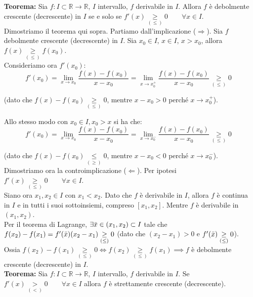 \documentclass{article}
\begin{document}
\noindent\textbf{Teorema:} Sia $f: I \subset \mathbb{R} \xrightarrow{} \mathbb{R}$, $I$ intervallo, $f$ derivabile in $I$. Allora $f$ è debolmente crescente (decrescente) in $I$ se e solo se $f'(x) \underset{(\leq)}{\geq} 0 \qquad \forall x \in I$.\\

\noindent Dimostriamo il teorema qui sopra. Partiamo dall'implicazione ($\Rightarrow$). Sia $f$ debolmente crescente (decrescente) in $I$. Sia $x_0 \in I$, $x \in I$, $x > x_0$, allora $f(x) \underset{(\leq)}{\geq} f(x_0)$.\\
Consideriamo ora $f'(x_0)$:
\begin{equation*}
    f'(x_0) = \lim_{x \to x_0} \frac{f(x) - f(x_0)}{x - x_0} = \lim_{x \to x_0^+} \frac{f(x) - f(x_0)}{x - x_0} \underset{(\leq)}{\geq} 0
\end{equation*}

\noindent (dato che $f(x) - f(x_0) \underset{(\leq)}{\geq} 0$, mentre $x - x_0 > 0$ perché $x \to x_0^+$).

\noindent Allo stesso modo con $x_0 \in I, x_0 > x$ si ha che:
\begin{equation*}
    f'(x_0) = \lim_{x \to x_0} \frac{f(x) - f(x_0)}{x - x_0} = \lim_{x \to x_0^-} \frac{f(x) - f(x_0)}{x - x_0} \underset{(\leq)}{\geq} 0
\end{equation*}

\noindent (dato che $f(x) - f(x_0) \underset{(\geq)}{\leq} 0$, mentre $x - x_0 < 0$ perché $x \to x_0^-$).\\
Dimostriamo ora la controimplicazione ($\Leftarrow$). Per ipotesi $f'(x) \underset{(\leq)}{\geq} 0 \qquad \forall x \in I$.\\
Siano ora $x_1, x_2 \in I$ con $x_1 < x_2$. Dato che $f$ è derivabile in $I$, allora $f$ è continua in $I$ e in tutti i suoi sottoinsiemi, compreso $[x_1, x_2]$. Mentre $f$ è derivabile in $(x_1, x_2)$.\\
Per il teorema di Lagrange, $\exists \Bar{x} \in (x_1, x_2) \subset I$ tale che $f(x_2) - f(x_1) = f'(\Bar{x})(x_2 - x_1) \underset{(\leq)}{\geq} 0$ (dato che $(x_2 - x_1) > 0$ e $f'(\Bar{x}) \underset{(\leq)}{\geq} 0$). Ossia $f(x_2) - f(x_1) \underset{(\leq)}{\geq} 0 \iff f(x_2) \underset{(\leq)}{\geq} f(x_1) \implies f$ è debolmente crescente (decrescente) in $I$.\\

\noindent\textbf{Teorema:} Sia $f: I \subset \mathbb{R} \xrightarrow{} \mathbb{R}$, $I$ intervallo, $f$ derivabile in $I$. Se $f'(x) \underset{(<)}{>} 0 \qquad \forall x \in I$ allora $f$ è strettamente crescente (decrescente).\\
\end{document}

